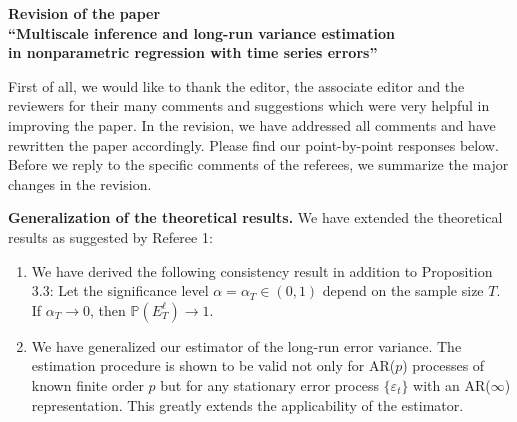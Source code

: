 \documentclass[a4paper,12pt]{article}
\begin{document}
\begin{center} 
{\large \bf Revision of the paper} \\[0.1cm]
{\large \bf ``Multiscale inference and long-run variance estimation} \\[0.1cm]
{\large \bf in nonparametric regression with time series errors''} 
\end{center}
\vspace{7pt}



First of all, we would like to thank the editor, the associate editor and the reviewers for their many comments and suggestions which were very helpful in improving the paper. In the revision, we have addressed all comments and have rewritten the paper accordingly. Please find our point-by-point responses below. 
Before we reply to the specific comments of the referees, we summarize the major changes in the revision.
\vspace{10pt}


\textbf{Generalization of the theoretical results.} We have extended the theoretical results as suggested by Referee 1:
\begin{enumerate}[label=(\roman*), leftmargin=0.8cm]

\item We have derived the following consistency result in addition to Proposition 3.3: Let the significance level $\alpha = \alpha_T \in (0,1)$ depend on the sample size $T$. If $\alpha_T \rightarrow 0$, then $\mathbb{P}({E}_T^{\ell}) \rightarrow 1$. 

\item We have generalized our estimator of the long-run error variance. The estimation procedure is shown to be valid not only for AR($p$) processes of known finite order $p$ but for any stationary error process $\{\varepsilon_t\}$ with an AR($\infty$) representation. This greatly extends the applicability of the estimator. 
\end{enumerate}
\vspace{3pt}
\end{document}
